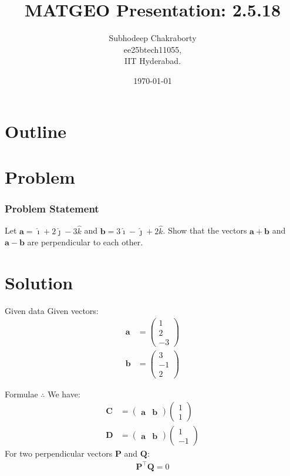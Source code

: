 \documentclass{beamer}
\title{MATGEO Presentation: 2.5.18}
\author{Subhodeep Chakraborty \\ ee25btech11055,\\IIT Hyderabad.}
\date{\today}
\theoremstyle{remark}
\newcommand{\myvec}[1]{\ensuremath{\begin{pmatrix}#1\end{pmatrix}}}
\let\vec\mathbf
\numberwithin{equation}{section}
\begin{document}
\begin{frame}
\titlepage
\end{frame}

\section*{Outline}
\begin{frame}
\tableofcontents
\end{frame}

\section{Problem}
\begin{frame}
\frametitle{Problem Statement}

Let $\vec{a} = \hat{\imath} + 2\hat{\jmath} -3\hat{k}$ and $\vec{b} = 3\hat{\imath} - \hat{\jmath} + 2\hat{k}$. Show that the vectors $\vec{a}+\vec{b}$ and $\vec{a}-\vec{b}$ are perpendicular to each other.

\end{frame}

\section{Solution}
\begin{frame}{Given data}
Given vectors:
\begin{align}
 \vec{a} &= \myvec{1 \\ 2 \\ -3} \\
 \vec{b} &= \myvec{3 \\ -1 \\ 2}
\end{align}
\end{frame}

\begin{frame}{Formulae}
$\therefore$ We have:
\begin{align}
\vec{C} &= \myvec{\vec{a} & \vec{b}}\myvec{1 \\ 1} \\ %
\vec{D} &= \myvec{\vec{a} & \vec{b}}\myvec{1 \\ -1} %
\end{align}
For two perpendicular vectors $\vec{P}$ and $\vec{Q}$:
\begin{align}
 \vec{P}^\top\vec{Q} = 0
\end{align}
\end{frame}
\end{document}

